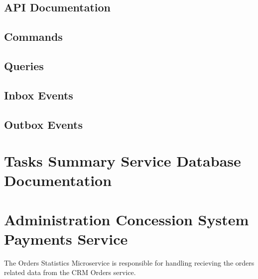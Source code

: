\documentclass[letterpaper,10pt,english]{sphinxmanual}
\begin{document}
\subsection{API Documentation}
\label{\detokenize{administration_concession_system/tasks_summary_service:api-documentation}}

\subsection{Commands}
\label{\detokenize{administration_concession_system/tasks_summary_service:commands}}

\subsection{Queries}
\label{\detokenize{administration_concession_system/tasks_summary_service:queries}}

\subsection{Inbox Events}
\label{\detokenize{administration_concession_system/tasks_summary_service:inbox-events}}

\subsection{Outbox Events}
\label{\detokenize{administration_concession_system/tasks_summary_service:outbox-events}}

\section{Tasks Summary Service Database Documentation}
\label{\detokenize{administration_concession_system/tasks_summary_service:tasks-summary-service-database-documentation}}
\sphinxstepscope


\section{Administration Concession System Payments Service}
\label{\detokenize{administration_concession_system/orders_service:administration-concession-system-payments-service}}\label{\detokenize{administration_concession_system/orders_service::doc}}
\sphinxAtStartPar
The Orders Statistics Microservice is responsible for handling recieving the orders related data from the CRM Orders service.

\end{document}
